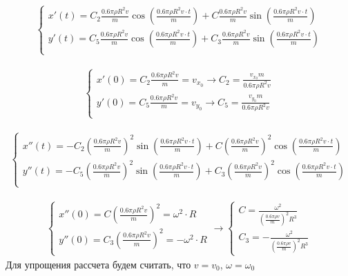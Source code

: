 \documentclass[a5paper, 10pt]{article}
\theoremstyle{definition}
\theoremstyle{plain}
\theoremstyle{remark}
\begin{document}
\begin{multline}
\begin{cases}
x'(t) = C_2 \frac{0.6 \pi \rho  R^{2} v}{m} \cos \left(\frac{0.6 \pi \rho  R^{2} v \cdot t}{m} \right) +  C\frac{0.6 \pi \rho  R^{2} v}{m} \sin \left(\frac{0.6 \pi \rho  R^{2} v \cdot t}{m} \right) \\
y'(t) = C_5 \frac{0.6 \pi \rho  R^{2} v}{m} \cos \left(\frac{0.6 \pi \rho  R^{2} v \cdot t}{m} \right) +  C_3 \frac{0.6 \pi \rho  R^{2} v}{m} \sin \left(\frac{0.6 \pi \rho  R^{2} v \cdot t}{m} \right)\\
\end{cases}
\end{multline}


\begin{multline}
\begin{cases}
x'(0) = C_2 \frac{0.6 \pi \rho  R^{2} v}{m} = v_{x_0} \to C_2 = \frac{ v_{x_0} m }{0.6 \pi \rho  R^{2} v} \\
y'(0) = C_5 \frac{0.6 \pi \rho  R^{2} v}{m} =  v_{y_0} \to C_5 = \frac{ v_{y_0} m }{0.6 \pi \rho  R^{2} v}\\
\end{cases}
\end{multline}


\begin{multline}
\begin{cases}
x''(t) = - C_2 \left( \frac{0.6 \pi \rho  R^{2} v}{m}\right)^2 \sin \left(\frac{0.6 \pi \rho  R^{2} v \cdot t}{m} \right) +  C\left(\frac{0.6 \pi \rho  R^{2} v}{m}\right)^2 \cos \left(\frac{0.6 \pi \rho  R^{2} v \cdot t}{m} \right) \\
y''(t) = - C_5 \left( \frac{0.6 \pi \rho  R^{2} v}{m}\right)^2 \sin \left(\frac{0.6 \pi \rho  R^{2} v \cdot t}{m} \right) +  C_3 \left( \frac{0.6 \pi \rho  R^{2} v}{m}\right)^2 \cos \left(\frac{0.6 \pi \rho  R^{2} v \cdot t}{m} \right)\\
\end{cases}
\end{multline}


\begin{multline}
\begin{cases}
x''(0) =  C\left(\frac{0.6 \pi \rho  R^{2} v}{m}\right)^2 = \omega^2 \cdot R \\
y''(0) =  C_3 \left( \frac{0.6 \pi \rho  R^{2} v}{m}\right)^2 = -\omega^2 \cdot R \\
\end{cases}
\to
\begin{cases}
C=\frac{ \omega^2}{\left( \frac{0.6 \pi \rho v}{m}\right)^2  R^3} \\
C_3 = -\frac{ \omega^2}{\left( \frac{0.6 \pi \rho v}{m}\right)^2  R^3}
\end{cases}
\end{multline}
Для упрощения рассчета будем считать, что $v = v_0$, $\omega = \omega_0$
\end{document}
